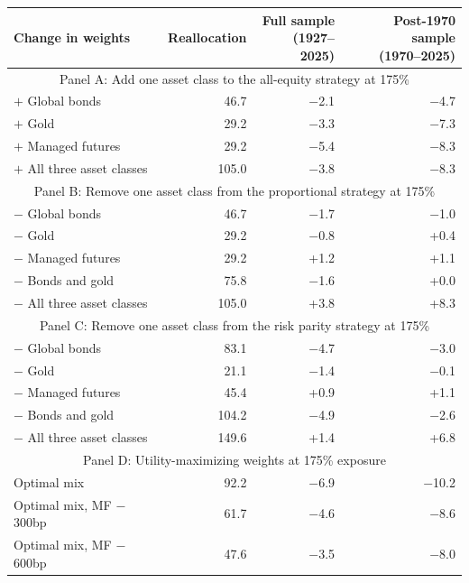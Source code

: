 \begin{table}[p]
{\setlength{\tabcolsep}{4pt}\small
\begin{tabular}{lrrr}\toprule
Change in weights & Reallocation & \shortstack{Full sample\\ (1927--2025)} & \shortstack{Post-1970 sample\\ (1970--2025)} \\ \midrule
\multicolumn{4}{c}{Panel A: Add one asset class to the all-equity strategy at 175\%} \\
$+$ Global bonds & 46.7 & $-$2.1 & $-$4.7 \\
$+$ Gold & 29.2 & $-$3.3 & $-$7.3 \\
$+$ Managed futures & 29.2 & $-$5.4 & $-$8.3 \\
$+$ All three asset classes & 105.0 & $-$3.8 & $-$8.3 \\
\midrule
\multicolumn{4}{c}{Panel B: Remove one asset class from the proportional strategy at 175\%} \\
$-$ Global bonds & 46.7 & $-$1.7 & $-$1.0 \\
$-$ Gold & 29.2 & $-$0.8 & +0.4 \\
$-$ Managed futures & 29.2 & +1.2 & +1.1 \\
$-$ Bonds and gold & 75.8 & $-$1.6 & +0.0 \\
$-$ All three asset classes & 105.0 & +3.8 & +8.3 \\
\midrule
\multicolumn{4}{c}{Panel C: Remove one asset class from the risk parity strategy at 175\%} \\
$-$ Global bonds & 83.1 & $-$4.7 & $-$3.0 \\
$-$ Gold & 21.1 & $-$1.4 & $-$0.1 \\
$-$ Managed futures & 45.4 & +0.9 & +1.1 \\
$-$ Bonds and gold & 104.2 & $-$4.9 & $-$2.6 \\
$-$ All three asset classes & 149.6 & +1.4 & +6.8 \\
\midrule
\multicolumn{4}{c}{Panel D: Utility-maximizing weights at 175\% exposure} \\
Optimal mix & 92.2 & $-$6.9 & $-$10.2 \\
Optimal mix, MF $-$300bp & 61.7 & $-$4.6 & $-$8.6 \\
Optimal mix, MF $-$600bp & 47.6 & $-$3.5 & $-$8.0 \\
\bottomrule\end{tabular}}
\end{table}
